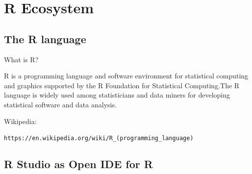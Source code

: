 \documentclass{beamer}
\begin{document}


\section{R Ecosystem}


\subsection[R language]{The R language}


\begin{frame}{What is R?} %

R is a programming language and software environment for statistical computing and graphics supported by the R Foundation for Statistical Computing.The R language is widely used among statisticians and data miners for developing statistical software and data analysis.

Wikipedia: 

\begin{footnotesize}
\texttt{https://en.wikipedia.org/wiki/R\_(programming\_language)}                                                                 \end{footnotesize}


\end{frame}


\subsection[R Studio]{R Studio as Open IDE for R}

\end{document}
